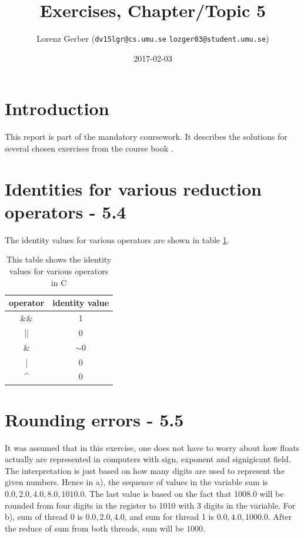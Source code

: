 \documentclass[a4paper,11pt,twoside]{article}
\title{Exercises, Chapter/Topic 5}
\author{Lorenz Gerber ({\tt{dv15lgr@cs.umu.se}} {\tt{lozger03@student.umu.se}})}
\date{2017-02-03}
\begin{document}
\lstset{language=C}
\maketitle
\thispagestyle{empty}
\newpage
\tableofcontents
\thispagestyle{empty}
\newpage

\clearpage
{}

\section{Introduction}
This report is part of the mandatory coursework. It describes the solutions for several chosen exercises from the course book \cite{pacheco2011}.

\section{Identities for various reduction operators - 5.4}

The identity values for various operators are shown in table \ref{tab:identity}.

\begin{table}[]
  \centering
  \caption{This table shows the identity values for various operators in C}
  \label{tab:identity}
  \begin{tabular}{cc}
    \multicolumn{1}{l}{operator} & \multicolumn{1}{l}{identity value} \\ \hline
    \&\&                         & 1                                  \\
    ||                           & 0                                  \\
    \&                           & $\sim$0                            \\
    |                            & 0                                  \\
    \textasciicircum             & 0
  \end{tabular}
\end{table}

\section{Rounding errors - 5.5}
It was assumed that in this exercise, one does not have to worry about how floats actually are represented in computers with sign, exponent and signigicant field.
The interpretation is just based on how many digits are used to represent the given numbers. Hence in a), the sequence of values in the variable sum is ${0.0, 2.0, 4.0, 8.0, 1010.0}$. The last value is based on the fact that 1008.0 will be rounded from four digits in the register to 1010 with 3 digits in the variable.
For b), sum of thread 0 is ${0.0, 2.0, 4.0}$, and sum for thread 1 is ${0.0, 4.0, 1000.0}$. After the reduce of sum from both threads, sum will be $1000$.
\end{document}
